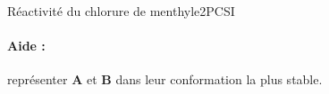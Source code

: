 \begin{exercise}{Réactivité du chlorure de menthyle}{2}{PCSI}
\begin{questions}
    \paragraph{Aide :} représenter \textbf{A} et \textbf{B} dans leur conformation la plus stable.\vspace{1.5em}
\end{questions}

\end{exercise}

    